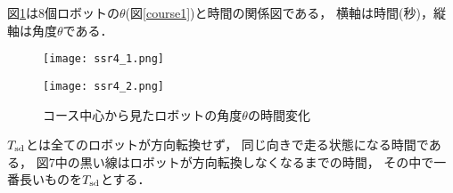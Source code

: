 図\ref{ssr}は8個ロボットの$\theta$(図\ref{course1})と時間の関係図である，
横軸は時間($秒$)，縦軸は角度$\theta$である．

\begin{figure}[!ht]
     \centering
     \texttt{[image: ssr4\_1.png]}
\end{figure}

\vspace{-8mm}
\begin{figure}[!ht]\label{ssr2}
     \centering
     \texttt{[image: ssr4\_2.png]}
     \caption{コース中心から見たロボットの角度$\theta$の時間変化}
     \label{ssr}
\end{figure}


$T_{\rm sd}$とは全てのロボットが方向転換せず，
同じ向きで走る状態になる時間である，
図7中の黒い線はロボットが方向転換しなくなるまでの時間，
その中で一番長いものを$T_{\rm sd}$とする．




